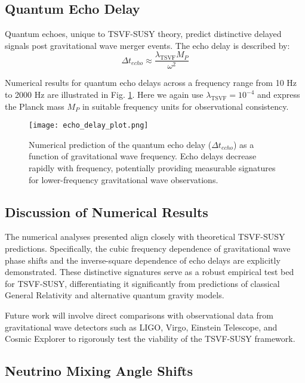 \documentclass[12pt, onecolumn]{article}
\theoremstyle{definition}
\numberwithin{equation}{section}
\begin{document}
\subsection{Quantum Echo Delay}\label{subsec:quantum_echo_delay}

Quantum echoes, unique to TSVF-SUSY theory, predict distinctive delayed signals post gravitational wave merger events. The echo delay is described by:
\begin{equation}\label{eq:echo_delay}
\Delta t_{echo} \approx \frac{\lambda_{\text{TSVF}} M_P}{\omega^2}
\end{equation}

Numerical results for quantum echo delays across a frequency range from 10 Hz to 2000 Hz are illustrated in Fig. \ref{fig:echo_delay}. Here we again use $\lambda_{\text{TSVF}} = 10^{-4}$ and express the Planck mass $M_P$ in suitable frequency units for observational consistency.

\begin{figure}[htbp]
\centering
\texttt{[image: echo\_delay\_plot.png]}
\caption{Numerical prediction of the quantum echo delay ($\Delta t_{echo}$) as a function of gravitational wave frequency. Echo delays decrease rapidly with frequency, potentially providing measurable signatures for lower-frequency gravitational wave observations.}
\label{fig:echo_delay}
\end{figure}

\subsection{Discussion of Numerical Results}\label{subsec:discussion_results}

The numerical analyses presented align closely with theoretical TSVF-SUSY predictions. Specifically, the cubic frequency dependence of gravitational wave phase shifts and the inverse-square dependence of echo delays are explicitly demonstrated. These distinctive signatures serve as a robust empirical test bed for TSVF-SUSY, differentiating it significantly from predictions of classical General Relativity and alternative quantum gravity models.

Future work will involve direct comparisons with observational data from gravitational wave detectors such as LIGO, Virgo, Einstein Telescope, and Cosmic Explorer to rigorously test the viability of the TSVF-SUSY framework.

\subsection{Neutrino Mixing Angle Shifts}  
\label{subsec:nu_sim}  
\end{document}
